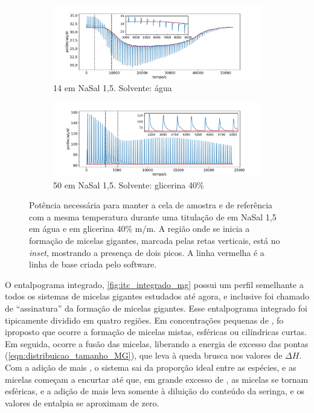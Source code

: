 		\begin{figure}
			\begin{subfigure}{\textwidth}
				\centering
				\includegraphics[width=\textwidth]{imagens/itc/exemplo_raw_mg}
				\caption{\TTAB{} 14 \mM em NaSal 1,5\mM. Solvente: água}
				\label{fig:itc_raw_mg}
			\end{subfigure}
		
			\begin{subfigure}{\textwidth}
				\centering
				\includegraphics[width=\textwidth]{imagens/itc/raw_itc_glicerina}
				\caption{\TTAB{} 50 \mM em NaSal 1,5\mM. Solvente: glicerina 40\%}
				\label{fig:raw_itc_mg_glicerina}
			\end{subfigure}
			
			\caption{Potência necessária para manter a cela de amostra e de referência com a mesma temperatura durante uma titulação de \TTAB{} em NaSal 1,5 \mM{} em água e em glicerina 40\% m/m. A região onde se inicia a formação de micelas gigantes, marcada pelas retas verticais, está no \emph{inset}, mostrando a presença de dois picos. A linha vermelha é a linha de base criada pelo software.}
			\label{fig:itc_raw_agua_glicerina}
		\end{figure}
	
		O entalpograma integrado, \autoref{fig:itc_integrado_mg} possui um perfil semelhante a todos os sistemas de micelas gigantes estudados até agora, e inclusive foi chamado de ``assinatura'' da formação de micelas gigantes. \cite{Ito2016}
		Esse entalpograma integrado foi tipicamente dividido em quatro regiões. Em concentrações pequenas de \TTAB, fo iproposto que ocorre a formação de micelas mistas, esféricas ou cilíndricas curtas. Em seguida, ocorre a fusão das micelas, liberando a energia de excesso das pontas (\autoref{eqn:distribuicao_tamanho_MG}), que leva à queda brusca nos valores de \(\Delta H\). Com a adição de mais \TTAB, o sistema sai da proporção ideal entre as espécies, e as micelas começam a encurtar até que, em grande excesso de \TTAB, as micelas se tornam esféricas, e a adição de mais \TTAB{} leva somente à diluição do conteúdo da seringa, e os valores de entalpia se aproximam de zero.\cite{Shukla2008, Ito2015c}
		
